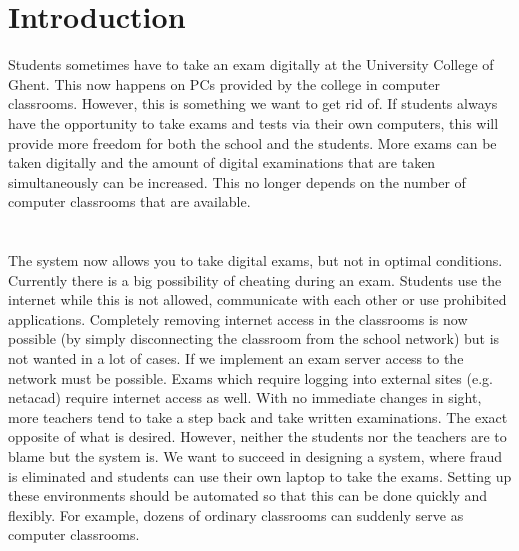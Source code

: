 
\section{Introduction} %
\label{sec:introductie}

Students sometimes have to take an exam digitally at the University College of Ghent. This now happens on PCs provided by the college in computer classrooms. However, this is something we want to get rid of. If students always have the opportunity to take exams and tests via their own computers, this will provide more freedom for both the school and the students. More exams can be taken digitally and the amount of digital examinations that are taken simultaneously can be increased. This no longer depends on the number of computer classrooms that are available.\\
\\
\\
The system now allows you to take digital exams, but not in optimal conditions. Currently there is a big possibility of cheating during an exam. Students use the internet while this is not allowed, communicate with each other or use prohibited applications. Completely removing internet access in the classrooms is now possible (by simply disconnecting the classroom from the school network) but is not wanted in a lot of cases. If we implement an exam server access to the network must be possible. Exams which require logging  into external sites (e.g. netacad) require internet access as well.  With no immediate changes in sight, more teachers tend to take a step back and take written examinations. The exact opposite of what is desired. However, neither the students nor the teachers are to blame but the system is. We want to succeed in designing a system, where fraud is eliminated and students can use their own laptop to take the exams. Setting up these environments should be automated so that this can be done quickly and flexibly. For example, dozens of ordinary classrooms can suddenly serve as computer classrooms. \\
